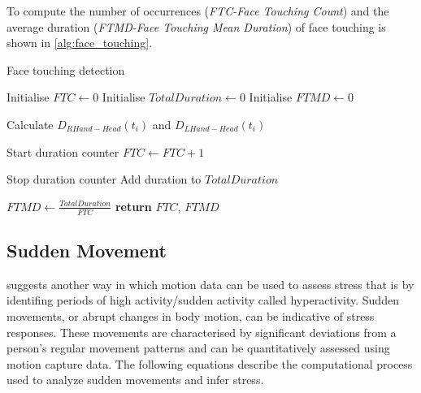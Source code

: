 To compute the number of occurrences (\textit{FTC-Face Touching Count}) and the average duration (\textit{FTMD-Face Touching Mean Duration}) of face touching is shown in  \autoref{alg:face_touching}.

    \begin{algorithm}
        \caption{Face touching detection}
          \label{alg:face_touching}
        \begin{algorithmic}[1]
          \Statex
            \State Initialise $FTC \gets 0$ 
            \State Initialise $TotalDuration \gets 0$ 
            \State Initialise $FTMD \gets 0$ 
            
              \State Calculate $D_{RHand-Head}(t_i)$ and $D_{LHand-Head}(t_i)$
              
                \State Start duration counter
                \State $FTC \gets FTC + 1$
              \EndIf
              
                \State Stop duration counter
                \State Add duration to $TotalDuration$
              \EndIf
            \EndFor
            
                \State $FTMD \gets \frac{TotalDuration}{FTC}$ 
            \EndIf
            \State \textbf{return} $FTC$, $FTMD$
          \EndFunction
        \end{algorithmic}
      \end{algorithm}

      
\subsection*{Sudden Movement}
\label{subsec:sudden_movement_analysis}

\textcite{hyperactivity} suggests another way in which motion data can be used to assess stress that is by identifing periods of
high activity/sudden activity called hyperactivity.
Sudden movements, or abrupt changes in body motion, can be indicative of stress responses. These movements are characterised by significant deviations from a person's regular movement patterns and can be quantitatively assessed using motion capture data. The following equations describe the computational process used to analyze sudden movements and infer stress.

